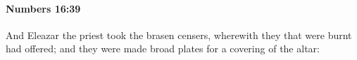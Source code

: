
		\paragraph{Numbers 16:39} %
			\label{NUMBERS-16-39}

			And Eleazar the priest took the brasen censers, wherewith they that were burnt had offered; and they were made broad plates for a covering of the altar:


